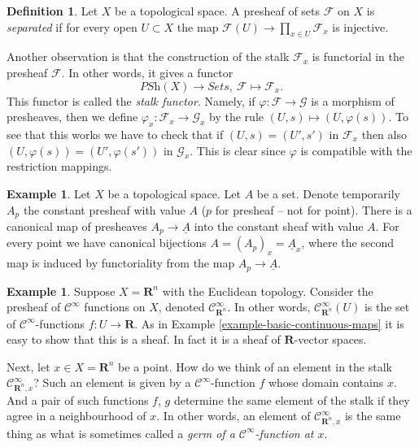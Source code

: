\documentclass{stacks-project}
\theoremstyle{plain}
\theoremstyle{definition}
\newtheorem{definition}[subsection]{Definition}
\newtheorem{example}[subsection]{Example}
\theoremstyle{remark}
\numberwithin{equation}{subsection}
\begin{document}
\begin{definition}
\label{definition-separated}
Let $X$ be a topological space.
A presheaf of sets $\mathcal{F}$ on $X$ is {\it separated}
if for every open $U \subset X$ the map
$\mathcal{F}(U) \to \prod_{x \in U} \mathcal{F}_x$ is
injective.
\end{definition}

\noindent
Another observation is that the construction of the stalk
$\mathcal{F}_x$ is functorial in the presheaf $\mathcal{F}$.
In other words, it gives a functor
$$
\textit{PSh}(X) \longrightarrow \textit{Sets},
\ \mathcal{F} \longmapsto \mathcal{F}_x.
$$
This functor is called the {\it stalk functor}.
Namely, if $\varphi : \mathcal{F} \to \mathcal{G}$ is
a morphism of presheaves, then we define
$\varphi_x : \mathcal{F}_x \to \mathcal{G}_x$
by the rule $(U, s) \mapsto (U, \varphi(s))$.
To see that this works we have to check that
if $(U, s) = (U', s')$ in $\mathcal{F}_x$ then also
$(U, \varphi(s)) = (U', \varphi(s'))$ in $\mathcal{G}_x$.
This is clear since $\varphi$ is compatible with the
restriction mappings.

\begin{example}
\label{example-stalk-constant-presheaf}
Let $X$ be a topological space. Let $A$ be a set.
Denote temporarily $A_p$ the constant presheaf
with value $A$ ($p$ for presheaf -- not for point).
There is a canonical map of presheaves
$A_p \to \underline{A}$ into the constant sheaf with
value $A$. For every point we have canonical
bijections $A = (A_p)_x = \underline{A}_x$, where
the second map is induced by functoriality from
the map $A_p \to \underline{A}$.
\end{example}



\begin{example}
\label{example-germs-functions}
Suppose $X = \mathbf{R}^n$ with the Euclidean topology.
Consider the presheaf of $\mathcal{C}^\infty$ functions
on $X$, denoted $\mathcal{C}^\infty_{\mathbf{R}^n}$.
In other words, $\mathcal{C}^\infty_{\mathbf{R}^n}(U)$ is the set
of $\mathcal{C}^\infty$-functions $f : U \to \mathbf{R}$.
As in Example \ref{example-basic-continuous-maps}
it is easy to show that this is a sheaf. In fact it
is a sheaf of $\mathbf{R}$-vector spaces.

\medskip\noindent
Next, let $x \in X = \mathbf{R}^n$ be a point. How do
we think of an element in the stalk $\mathcal{C}^\infty_{\mathbf{R}^n, x}$?
Such an element is given by a $\mathcal{C}^\infty$-function
$f$ whose domain contains $x$. And a pair of such
functions $f$, $g$ determine
the same element of the stalk if they agree in a neighbourhood
of $x$. In other words, an element of $\mathcal{C}^\infty_{\mathbf{R}^n, x}$
is the same thing as what is sometimes called
a {\it germ of a $\mathcal{C}^\infty$-function at $x$}.
\end{example}
\end{document}
